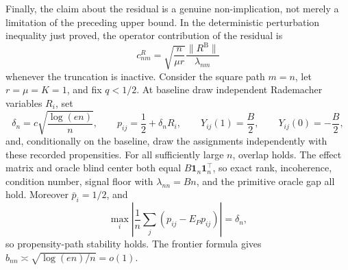 Finally, the claim about the residual is a genuine non-implication, not merely a limitation of the preceding upper bound.  In the deterministic perturbation inequality just proved, the operator contribution of the residual is
\[
 c^{R}_{nm}=\sqrt{\frac n{\mu r}}\frac{\lVert R^{\mathrm B}\rVert}{\lambda_{nm}}
\]
whenever the truncation is inactive.  Consider the square path \(m=n\), let \(r=\mu=K=1\), and fix \(q<1/2\).  At baseline draw independent Rademacher variables \(R_i\), set
\[
 \delta_n=c\sqrt{\frac{\log(en)}n},\qquad
 p_{ij}=\frac12+\delta_nR_i,\qquad
 Y_{ij}(1)=\frac B2,\qquad Y_{ij}(0)=-\frac B2,
\]
and, conditionally on the baseline, draw the assignments independently with these recorded propensities.  For all sufficiently large \(n\), overlap holds.  The effect matrix and oracle blind center both equal \(B\mathbf1_n\mathbf1_n^\top\), so exact rank, incoherence, condition number, signal floor with \(\lambda_{nn}=Bn\), and the primitive oracle gap all hold.  Moreover \(\bar p_i=1/2\), and
\[
 \max_i\left|\frac1n\sum_j(p_{ij}-E_Pp_{ij})\right|=\delta_n,
\]
so propensity-path stability holds.  The frontier formula gives \(b_{nn}\asymp\sqrt{\log(en)/n}=o(1)\).

